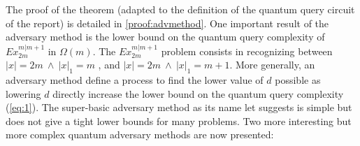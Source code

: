 The proof of the theorem (adapted to the definition of the quantum query
circuit of the report) is detailed in \autoref{proof:advmethod}.
One important result of the adversary method is the lower bound on
the quantum query complexity of $Ex_{2m}^{m \vert m+1}$ in
$\Omega\left(m\right)$. The $Ex_{2m}^{m\vert m+1}$ problem consists in
recognizing between $|x|=2m\ \land\ |x|_1 = m$ , and $|x|=2m\
    \land\ |x|_1 = m+1$. More generally, an adversary method define
a process to find the lower value of $d$ possible  as lowering $d$
directly increase the lower bound on the quantum query complexity
(\autoref{eq:1}). The super-basic adversary method as its name let
suggests is simple but does not give a tight lower bounds for
many problems. Two more interesting but more complex quantum adversary
methods are now presented:


